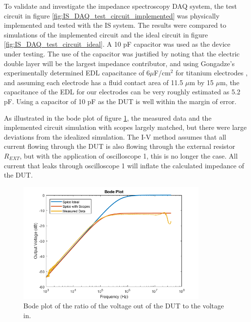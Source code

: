 \par To validate and investigate the impedance spectroscopy DAQ system, the test circuit in figure \ref{fig:IS_DAQ_test_circuit_implemented} was physically implemented and tested with the IS system. The results were compared to simulations of the implemented circuit and the ideal circuit in figure \ref{fig:IS_DAQ_test_circuit_ideal}. A 10 pF capacitor was used as the device under testing. The use of the capacitor was justified by noting that the electric double layer will be the largest impedance contributor, and using Gongadze's experimentally determined EDL capacitance of 6$\mu$F/cm$^2$ for titanium electrodes \cite{_gongadze.pdf_????}, and assuming each electrode has a fluid contact area of 11.5 $\mu$m by 15 $\mu$m, the capacitance of the EDL for our electrodes can be very roughly estimated as 5.2 pF. Using a capacitor of 10 pF as the DUT is well within the margin of error.  

\par As illustrated in the bode plot of figure \ref{fig:test_circuit_bode}, the measured data and the implemented circuit simulation with scopes largely matched, but there were large deviations from the idealized simulation. The I-V method assumes that all current flowing through the DUT is also flowing through the external resistor $R_{EXT}$, but with the application of oscilloscope 1, this is no longer the case. All current that leaks through oscilloscope 1 will inflate the calculated impedance of the DUT.  

\begin{figure}[h]
    \centering
    \includegraphics[width=0.85\textwidth]{images/spice-measured-comp.png}
    \caption{Bode plot of the ratio of the voltage out of the DUT to the voltage in.}
    \label{fig:test_circuit_bode}
\end{figure}

